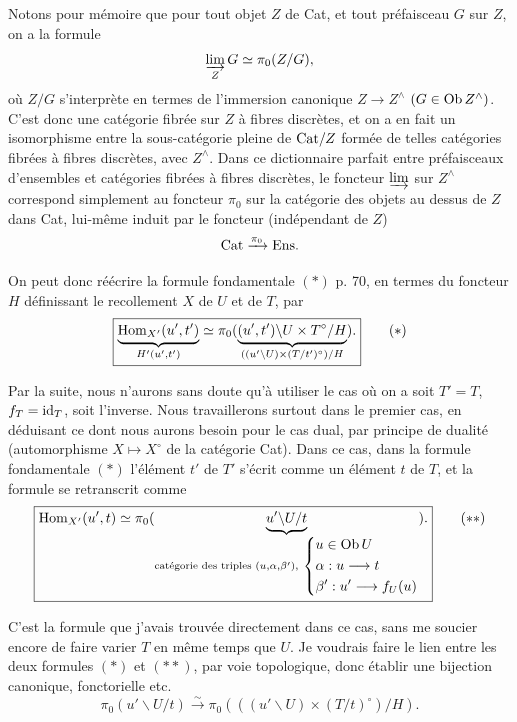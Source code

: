 Notons pour mémoire que pour tout objet $Z$ de Cat, et tout préfaisceau $G$ sur $Z$, on a la formule
\[
\varinjlim_{Z} G \simeq \pi_0(Z/G),
\]
où $Z/G$ s'interprète en termes de l'immersion canonique $Z\longrightarrow Z^{\wedge}$ $(G\in \mathrm{Ob}\, Z^{\wedge})$. C'est donc une catégorie fibrée sur $Z$ à fibres discrètes, et on a en fait un isomorphisme entre la sous-catégorie pleine de $\mathrm{Cat}/Z$ formée de telles catégories fibrées à fibres discrètes, avec $Z^{\wedge}$. Dans ce dictionnaire parfait entre préfaisceaux d'ensembles et catégories fibrées à fibres discrètes, le foncteur $\varinjlim$ sur $Z^{\wedge}$ correspond simplement au foncteur $\pi_0$ sur la catégorie des objets au dessus de $Z$ dans Cat, lui-même induit par le foncteur (indépendant de $Z$)
\[
\mathrm{Cat} \xrightarrow{\pi_0} \mathrm{Ens}.
\]

 On peut donc réécrire la formule fondamentale $(*)$ p. 70, en termes du foncteur $H$ définissant le recollement $X$ de $U$ et de $T$, par
\[
\boxed{\underbrace{\Hom_{X'}(u',t')}_{H'(u',t')} \simeq \pi_0(\underbrace{(u',t')\backslash U\times T^{\circ}/H}_{((u'\backslash U)\times(T/t')^{\circ})/H}).}
\tag*{$(*)$}
\]

Par la suite, nous n'aurons sans doute qu'à utiliser le cas où on a soit $T'=T$, $f_T=\mathrm{id}_T$, soit l'inverse. Nous travaillerons surtout dans le premier cas, en déduisant ce dont nous aurons besoin pour le cas dual, par principe de dualité (automorphisme $X\longmapsto X^{\circ}$ de la
catégorie Cat). Dans ce cas, dans la formule fondamentale $(*)$ l'élément $t'$ de $T'$ s'écrit comme un élément $t$ de $T$, et la formule se retranscrit comme
\[
\boxed{\Hom_{X'}(u',t) \simeq \pi_0(\underbrace{u'\backslash U/t}_{\text{catégorie des triples } (u,\alpha,\beta'),\ \left\{\begin{aligned} &u\in \Ob U\\ &\alpha : u\longrightarrow t\\ &\beta' : u'\longrightarrow f_U(u)\end{aligned}\right.}).}
\tag*{$(**)$}
\]

C'est la formule que j'avais trouvée directement dans ce cas, sans me soucier encore de faire varier $T$ en même temps que $U$. Je voudrais faire le lien entre les deux formules $(*)$ et $(**)$, par voie topologique, donc établir une bijection canonique, fonctorielle etc.
\[
\pi_0(u'\backslash U/t) \xrightarrow{\sim} \pi_0(((u'\backslash U)\times(T/t)^{\circ})/H).
\]

